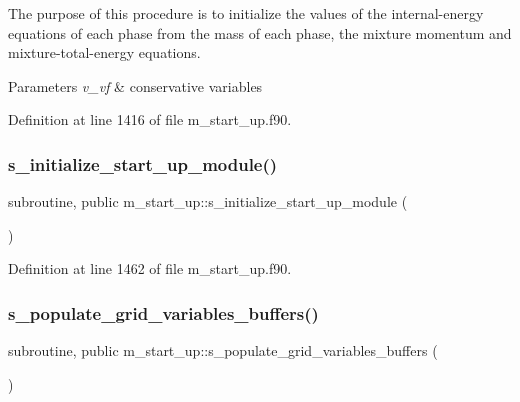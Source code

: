 The purpose of this procedure is to initialize the values of the internal-\/energy equations of each phase from the mass of each phase, the mixture momentum and mixture-\/total-\/energy equations. 


\begin{DoxyParams}{Parameters}
{\em v\+\_\+vf} & conservative variables \\
\hline
\end{DoxyParams}


Definition at line 1416 of file m\+\_\+start\+\_\+up.\+f90.

\mbox{\label{namespacem__start__up_a37202711d89d04cd18f08170ba608aa1}} 
\subsubsection{\texorpdfstring{s\+\_\+initialize\+\_\+start\+\_\+up\+\_\+module()}{s\_initialize\_start\_up\_module()}}
{\footnotesize\ttfamily subroutine, public m\+\_\+start\+\_\+up\+::s\+\_\+initialize\+\_\+start\+\_\+up\+\_\+module (\begin{DoxyParamCaption}{ }\end{DoxyParamCaption})}



Definition at line 1462 of file m\+\_\+start\+\_\+up.\+f90.

\mbox{\label{namespacem__start__up_afd813d91357dc4664a58c690e935ccbd}} 
\subsubsection{\texorpdfstring{s\+\_\+populate\+\_\+grid\+\_\+variables\+\_\+buffers()}{s\_populate\_grid\_variables\_buffers()}}
{\footnotesize\ttfamily subroutine, public m\+\_\+start\+\_\+up\+::s\+\_\+populate\+\_\+grid\+\_\+variables\+\_\+buffers (\begin{DoxyParamCaption}{ }\end{DoxyParamCaption})}



